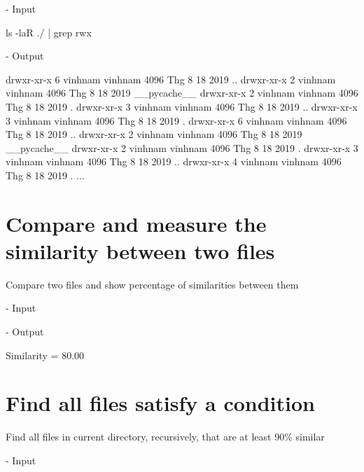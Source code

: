 \documentclass[10pt, a4paper]{article}
\begin{document}
\noindent - Input

\begin{verbbox}
ls -laR ./ | grep rwx
\end{verbbox}

\fbox{
\theverbbox
}

\noindent - Output

\begin{verbbox}
drwxr-xr-x 6 vinhnam vinhnam 4096 Thg 8 18  2019 ..
drwxr-xr-x 2 vinhnam vinhnam 4096 Thg 8 18  2019 __pycache__
drwxr-xr-x 2 vinhnam vinhnam 4096 Thg 8 18  2019 .
drwxr-xr-x 3 vinhnam vinhnam 4096 Thg 8 18  2019 ..
drwxr-xr-x 3 vinhnam vinhnam 4096 Thg 8 18  2019 .
drwxr-xr-x 6 vinhnam vinhnam 4096 Thg 8 18  2019 ..
drwxr-xr-x 2 vinhnam vinhnam 4096 Thg 8 18  2019 __pycache__
drwxr-xr-x 2 vinhnam vinhnam 4096 Thg 8 18  2019 .
drwxr-xr-x 3 vinhnam vinhnam 4096 Thg 8 18  2019 ..
drwxr-xr-x 4 vinhnam vinhnam 4096 Thg 8 18  2019 .
...
\end{verbbox}

\fbox{
\theverbbox
}

\section{Compare and measure the similarity between two files}

Compare two files and show percentage of similarities between them

\noindent - Input


\fbox{
\theverbbox
}

\noindent - Output

\begin{verbbox}
Similarity = 80.00 %
\end{verbbox}

\fbox{
\theverbbox
}

\section{Find all files satisfy a condition}

Find all files in current directory, recursively, that are at least 90\% similar

\noindent - Input
\end{document}
